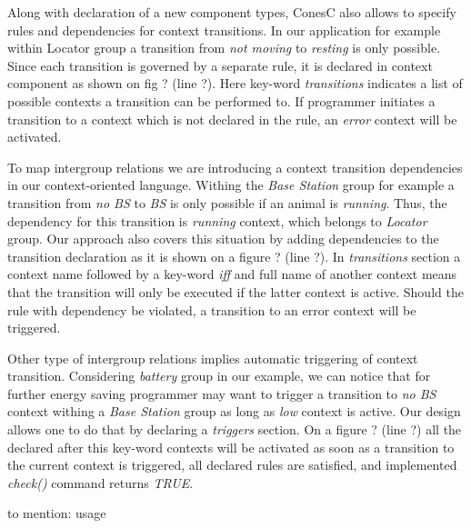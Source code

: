 Along with declaration of a new component types, ConesC also allows to specify rules and dependencies for context transitions. In our application for example within Locator group a transition from \emph{not moving} to \emph{resting} is only possible. Since each transition is governed by a separate rule, it is declared in context component as shown on fig ? (line ?). Here key-word \emph{transitions} indicates a list of possible contexts a transition can be performed to. If programmer initiates a transition to a context which is not declared in the rule, an \emph{error} context will be activated.

To map intergroup relations we are introducing a context transition dependencies in our context-oriented language. Withing the \emph{Base Station} group for example a transition from \emph{no BS} to \emph{BS} is only possible if an animal is \emph{running}. Thus, the dependency for this transition is \emph{running} context, which belongs to \emph{Locator} group. Our approach also covers this situation by adding dependencies to the transition declaration as it is shown on a figure ? (line ?). In \emph{transitions} section a context name followed by a key-word \emph{iff} and full name of another context means that the transition will only be executed if the latter context is active. Should the rule with dependency be violated, a transition to an error context will be triggered.

Other type of intergroup relations implies automatic triggering of context transition. Considering \emph{battery} group in our example, we can notice that for further energy saving programmer may want to trigger a transition to \emph{no BS} context withing a \emph{Base Station} group as long as \emph{low} context is active. Our design allows one to do that by declaring a \emph{triggers} section. On a figure ? (line ?) all the declared after this key-word contexts will be activated as soon as a transition to the current context is triggered, all declared rules are satisfied, and implemented \emph{check()} command returns \emph{TRUE}.

to mention: usage